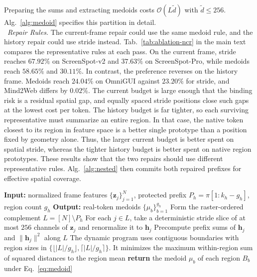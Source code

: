 %
Preparing the sums and extracting medoids costs $\mathcal{O}(L\tilde{d})$ with $\tilde{d}\leq 256$.
%
Alg.~\ref{alg:medoid} specifies this partition in detail.
\\
\noindent{}~\textit{Repair Rules.}
The current-frame repair could use the same medoid rule, and the history repair could use stride instead.
%
Tab.~\ref{tab:ablation-ncr} in the main text compares the representative rules at each pass.
%
On the current frame, stride reaches $67.92\%$ on ScreenSpot-v2 and $37.63\%$ on ScreenSpot-Pro, while medoids reach $58.65\%$ and $30.11\%$.
%
In contrast, the preference reverses on the history frame.
%
Medoids reach $24.04\%$ on OmniGUI against $23.20\%$ for stride, and Mind2Web differs by $0.02\%$.
%
The current budget is large enough that the binding risk is a residual spatial gap, and equally spaced stride positions close such gaps at the lowest cost per token.
%
The history budget is far tighter, so each surviving representative must summarize an entire region.
%
In that case, the native token closest to its region in feature space is a better single prototype than a position fixed by geometry alone.
%
Thus, the larger current budget is better spent on spatial stride, whereas the tighter history budget is better spent on native region prototypes.
%
These results show that the two repairs should use different representative rules.
%
Alg.~\ref{alg:nested} then commits both repaired prefixes for effective spatial coverage.
\begin{algorithm}[tpb]
\caption{History Medoid Partition (\awc{}-H)}
\label{alg:medoid}
\begin{algorithmic}[1]
\STATE \textbf{Input:} normalized frame features $\{\mathbf z_j\}_{j=1}^{N}$, protected prefix $P_h=\pi[1{:}k_h-g_h]$, region count $g_h$
\STATE \textbf{Output:} real-token medoids $\{\mu_b\}_{b=1}^{g_h}$
\STATE Form the raster-ordered complement $L=[N]\setminus P_h$
\STATE For each $j\in L$, take a deterministic stride slice of at most $256$ channels of $\mathbf z_j$ and renormalize it to $\mathbf h_j$
\STATE Precompute prefix sums of $\mathbf h_j$ and $\lVert\mathbf h_j\rVert^2$ along $L$
\STATE The dynamic program uses contiguous boundaries with region sizes in $\{\lfloor|L|/g_h\rfloor,\lceil|L|/g_h\rceil\}$. It minimizes the maximum within-region sum of squared distances to the region mean
\STATE \textbf{return} the medoid $\mu_b$ of each region $B_b$ under Eq.~\ref{eq:medoid}
\end{algorithmic}
\end{algorithm}
\\
